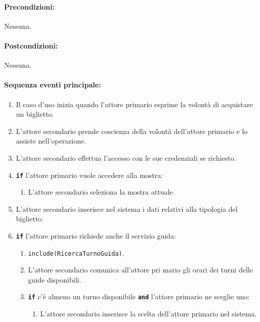 \documentclass{article}
\begin{document}
	\paragraph{Precondizioni:}Nessuna.
	
	\paragraph{Postcondizioni:}Nessuna.
	
	\paragraph{Sequenza eventi principale:}

		\begin{enumerate}[itemsep=5pt,parsep=0pt]

		\item Il caso d'uso inizia quando l'attore primario esprime la volontà di acquistare un biglietto.

		\item L'attore secondario prende coscienza della volontà dell'attore primario e lo assiste nell'operazione.

		\item L'attore secondario effettua l'accesso con le sue credenziali se richiesto.

		\item \texttt{\textbf{if}} l'attore primario vuole accedere alla mostra:
			\begin{enumerate}	[leftmargin=28pt]
				\item L'attore secondario seleziona la mostra attuale.
  			\end{enumerate}	

		\item L'attore secondario inserisce nel sistema i dati relativi alla tipologia del biglietto.

		\item \texttt{\textbf{if}} l'attore primario richiede anche il servizio guida:
			\begin{enumerate}[leftmargin=28pt]
				\item  \texttt{{include(RicercaTurnoGuida)}}.
				\item L'attore secondario comunica all'attore pri mario gli orari dei turni delle guide disponibili.
				\item \texttt{\textbf{if}} c'è almeno un turno disponibile \texttt{\textbf{and}} l'attore primario ne sceglie uno:
					\begin{enumerate}[leftmargin=34pt]
						\item L'attore secondario inserisce la scelta dell'attore primario nel sistema.
					\end{enumerate}
  			\end{enumerate}	


\end{enumerate}
\end{document}
